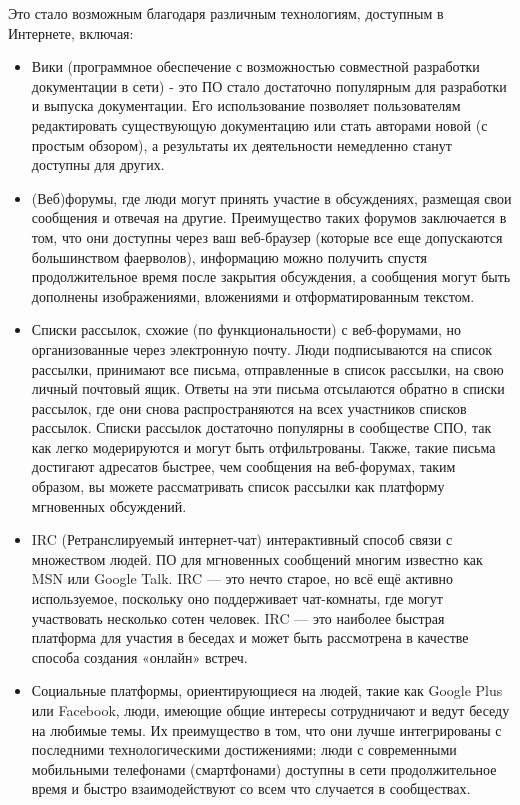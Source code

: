 \documentclass[10pt]{book}
\begin{document}
Это стало возможным благодаря различным технологиям, доступным в Интернете, включая:

\begin{itemize}
	\item Вики (программное обеспечение с возможностью совместной разработки документации в сети) - это ПО стало достаточно популярным для разработки и выпуска документации. Его использование позволяет пользователям редактировать существующую документацию или стать авторами новой (с простым обзором), а результаты их деятельности немедленно станут доступны для других.
	\item (Веб)форумы, где люди могут принять участие в обсуждениях, размещая свои сообщения и отвечая на другие. Преимущество таких форумов заключается в том, что они доступны через ваш веб-браузер (которые все еще допускаются большинством фаерволов), информацию можно получить спустя продолжительное время после закрытия обсуждения, а сообщения могут быть дополнены изображениями, вложениями и отформатированным текстом.
	\item Списки рассылок, схожие (по функциональности) с веб-форумами, но организованные через электронную почту. Люди подписываются на список рассылки,  принимают все письма, отправленные в список рассылки, на свою личный почтовый ящик. Ответы на эти письма отсылаются обратно в списки рассылок, где они снова распространяются на всех участников списков рассылок. Списки рассылок достаточно популярны в сообществе СПО, так как легко модерируются и могут быть отфильтрованы. Также, такие письма достигают адресатов быстрее, чем сообщения на веб-форумах, таким образом, вы можете рассматривать список рассылки как платформу мгновенных обсуждений.
	\item IRC (Ретранслируемый интернет-чат) интерактивный способ связи с множеством людей. ПО для мгновенных сообщений многим известно как MSN или Google Talk. IRC — это нечто старое, но всё ещё активно используемое, поскольку оно поддерживает чат-комнаты, где могут участвовать несколько сотен человек. IRC — это наиболее быстрая платформа для участия в беседах и может быть рассмотрена в качестве способа создания «онлайн» встреч.
	\item Социальные платформы, ориентирующиеся на людей, такие как Google Plus или Facebook, люди, имеющие общие интересы сотрудничают и ведут беседу на любимые темы. Их преимущество в том, что они лучше интегрированы с последними технологическими достижениями; люди с современными мобильными телефонами (смартфонами) доступны в сети продолжительное время и быстро взаимодействуют со всем что случается в сообществах.
\end{itemize}
\end{document}
